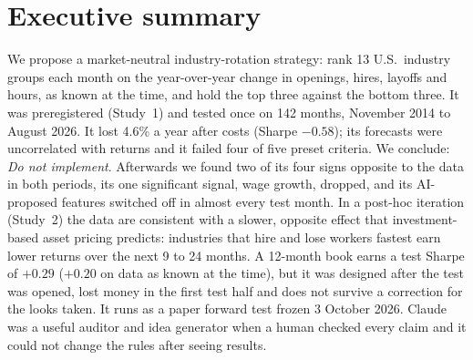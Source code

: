 
\newcommand{\fit}[1]{\resizebox{\ifdim\width>\linewidth\linewidth\else\width\fi}{!}{#1}}   %

\MakeCover

\section{Executive summary}\label{sec:summary}
We propose a market-neutral industry-rotation strategy: rank 13 U.S.\ industry groups each month on the year-over-year change in openings, hires, layoffs and hours, as known at the time, and hold the top three against the bottom three. It was preregistered (Study~1) and tested once on 142 months, November 2014 to August 2026. It lost 4.6\% a year after costs (Sharpe $-0.58$); its forecasts were uncorrelated with returns and it failed four of five preset criteria. %
We conclude: \emph{Do not implement}. Afterwards we found two of its four signs opposite to the data in both periods, its one significant signal, wage growth, dropped, and its AI-proposed features switched off in almost every test month. %
In a post-hoc iteration (Study~2) the data are consistent with a slower, opposite effect that investment-based asset pricing predicts: industries that hire and lose workers fastest earn lower returns over the next 9 to 24 months. A 12-month book earns a test Sharpe of $+0.29$ ($+0.20$ on data as known at the time), %
but it was designed after the test was opened, lost money in the first test half and does not survive a correction for the looks taken. %
It runs as a paper forward test frozen 3 October 2026. %
Claude was a useful auditor and idea generator when a human checked every claim and it could not change the rules after seeing results. %

